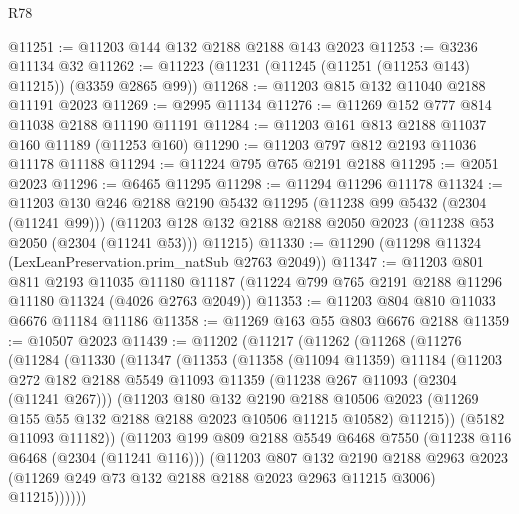 \begin{lexlean}{R78}
\begin{coremodule}
@11251 := @11203 @144 @132 @2188 @2188 @143 @2023
@11253 := @3236 @11134 @32
@11262 := @11223 (@11231 (@11245 (@11251 (@11253 @143) @11215)) (@3359 @2865 @99))
@11268 := @11203 @815 @132 @11040 @2188 @11191 @2023
@11269 := @2995 @11134
@11276 := @11269 @152 @777 @814 @11038 @2188 @11190 @11191
@11284 := @11203 @161 @813 @2188 @11037 @160 @11189 (@11253 @160)
@11290 := @11203 @797 @812 @2193 @11036 @11178 @11188
@11294 := @11224 @795 @765 @2191 @2188
@11295 := @2051 @2023
@11296 := @6465 @11295
@11298 := @11294 @11296 @11178
@11324 := @11203
    @130
    @246
    @2188
    @2190
    @5432
    @11295
    (@11238 @99 @5432 (@2304 (@11241 @99)))
    (@11203 @128 @132 @2188 @2188 @2050 @2023 (@11238 @53 @2050 (@2304 (@11241 @53))) @11215)
@11330 := @11290 (@11298 @11324 (LexLeanPreservation.prim_natSub @2763 @2049))
@11347 := @11203
    @801
    @811
    @2193
    @11035
    @11180
    @11187
    (@11224 @799 @765 @2191 @2188 @11296 @11180 @11324 (@4026 @2763 @2049))
@11353 := @11203 @804 @810 @11033 @6676 @11184 @11186
@11358 := @11269 @163 @55 @803 @6676 @2188
@11359 := @10507 @2023
@11439 := @11202
    (@11217
      (@11262
        (@11268
          (@11276
            (@11284
              (@11330
                (@11347
                  (@11353
                    (@11358
                      (@11094 @11359)
                      @11184
                      (@11203
                        @272
                        @182
                        @2188
                        @5549
                        @11093
                        @11359
                        (@11238 @267 @11093 (@2304 (@11241 @267)))
                        (@11203
                          @180
                          @132
                          @2190
                          @2188
                          @10506
                          @2023
                          (@11269 @155 @55 @132 @2188 @2188 @2023 @10506 @11215 @10582)
                          @11215))
                      (@5182 @11093 @11182))
                    (@11203
                      @199
                      @809
                      @2188
                      @5549
                      @6468
                      @7550
                      (@11238 @116 @6468 (@2304 (@11241 @116)))
                      (@11203
                        @807
                        @132
                        @2190
                        @2188
                        @2963
                        @2023
                        (@11269 @249 @73 @132 @2188 @2188 @2023 @2963 @11215 @3006)
                        @11215))))))

\end{coremodule}
\end{lexlean}
